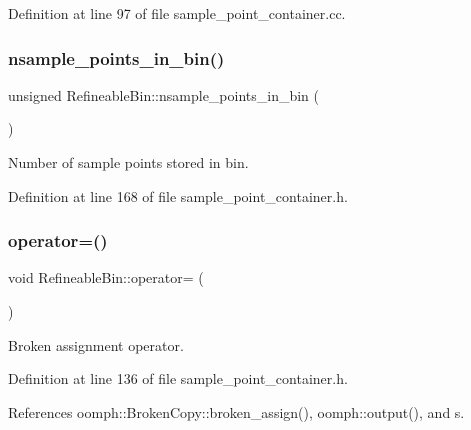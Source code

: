 Definition at line 97 of file sample\+\_\+point\+\_\+container.\+cc.

\mbox{\label{classRefineableBin_a377f1b457facf99566aab772af7260db}} 
\subsubsection{\texorpdfstring{nsample\+\_\+points\+\_\+in\+\_\+bin()}{nsample\_points\_in\_bin()}}
{\footnotesize\ttfamily unsigned Refineable\+Bin\+::nsample\+\_\+points\+\_\+in\+\_\+bin (\begin{DoxyParamCaption}{ }\end{DoxyParamCaption})\hspace{0.3cm}{\ttfamily [inline]}}



Number of sample points stored in bin. 



Definition at line 168 of file sample\+\_\+point\+\_\+container.\+h.

\mbox{\label{classRefineableBin_a22fae65a9869b4222a2ff1c8afe43661}} 
\subsubsection{\texorpdfstring{operator=()}{operator=()}}
{\footnotesize\ttfamily void Refineable\+Bin\+::operator= (\begin{DoxyParamCaption}\item[{const \hyperlink{classRefineableBin}{Refineable\+Bin} \&}]{ }\end{DoxyParamCaption})\hspace{0.3cm}{\ttfamily [inline]}}



Broken assignment operator. 



Definition at line 136 of file sample\+\_\+point\+\_\+container.\+h.



References oomph\+::\+Broken\+Copy\+::broken\+\_\+assign(), oomph\+::output(), and s.

